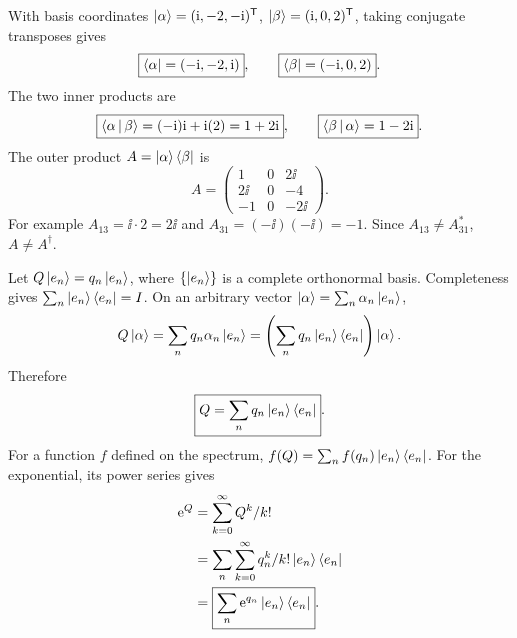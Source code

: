 With basis coordinates
$\left|\alpha\right\rangle=(\mathrm{i},-2,-\mathrm{i})^{\mathsf T}$,
$\left|\beta\right\rangle=(\mathrm{i},0,2)^{\mathsf T}$,
taking conjugate transposes gives
\begin{equation}
\boxed{\left\langle\alpha\right|=(-\mathrm{i},-2,\mathrm{i})},\qquad
\boxed{\left\langle\beta\right|=(-\mathrm{i},0,2)}.
\end{equation}
The two inner products are
\begin{equation}
\boxed{\left\langle\alpha\,\middle|\,\beta\right\rangle=
(-\mathrm{i})\mathrm{i}+\mathrm{i}(2)=1+2\mathrm{i}},\qquad
\boxed{\left\langle\beta\,\middle|\,\alpha\right\rangle=1-2\mathrm{i}}.
\end{equation}
The outer product $A=\left|\alpha\right\rangle\left\langle\beta\right|$ is
\begin{equation}
\boxed{A=
\begin{pmatrix}
1&0&2\ii\\
2\ii&0&-4\\
-1&0&-2\ii
\end{pmatrix}}.
\end{equation}
For example $A_{13}=\ii\cdot2=2\ii$ and
$A_{31}=(-\ii)(-\ii)=-1$.
Since $A_{13}\ne A_{31}^*$,
$\boxed{A\ne A^\dagger}$.

Let $Q\left|e_n\right\rangle=q_n\left|e_n\right\rangle$, where
$\{\left|e_n\right\rangle\}$ is a complete orthonormal
basis. Completeness gives
$\sum_n\left|e_n\right\rangle\left\langle e_n\right|=I$. On an arbitrary
vector $\left|\alpha\right\rangle=\sum_n\alpha_n\left|e_n\right\rangle$,
\begin{equation}
Q\left|\alpha\right\rangle=
\sum_nq_n\alpha_n\left|e_n\right\rangle=
\left(\sum_nq_n\left|e_n\right\rangle\left\langle e_n\right|\right)\left|\alpha\right\rangle.
\end{equation}
Therefore
\begin{equation}
\boxed{Q=\sum_nq_n\left|e_n\right\rangle\left\langle e_n\right|}.
\end{equation}
For a function $f$ defined on the spectrum,
$f(Q)=\sum_nf(q_n)\left|e_n\right\rangle\left\langle e_n\right|$.
For the exponential, its power series gives
\begin{align}
\mathrm{e}^Q&=\sum_{k=0}^\infty Q^k/k!\\
&=\sum_n\sum_{k=0}^\infty
q_n^k/k!\left|e_n\right\rangle\left\langle e_n\right|\\
&=\boxed{\sum_n\mathrm{e}^{q_n}\left|e_n\right\rangle\left\langle e_n\right|}.
\end{align}

